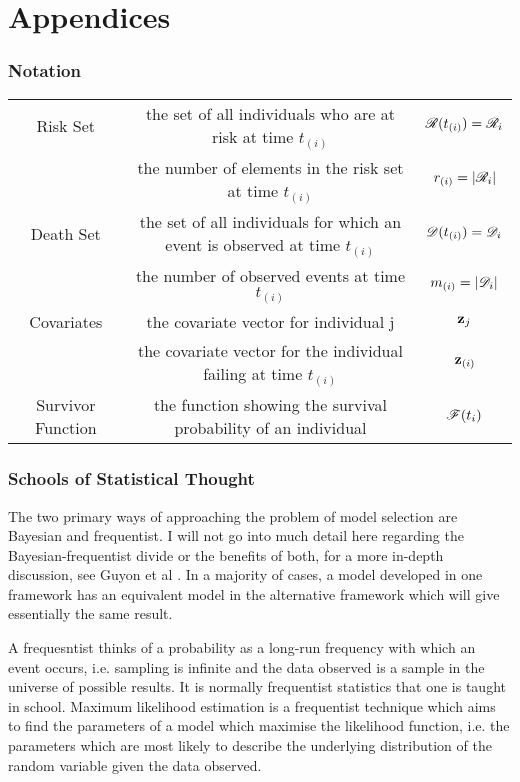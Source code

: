 \part{Appendices}
\begin{appendices}

\section{Notation}

\begin{tabular}{|c|c|c|}
    \hline
    Risk Set & the set of all individuals who are at risk at time $t_{(i)}$ & $\mathscr{R}(t_{(i)})=\mathscr{R}_i$\\
    & the number of elements in the risk set at time $t_{(i)}$ & $r_{(i)}=|\mathscr{R}_i|$ \\
    \hline
    Death Set & the set of all individuals for which an event is observed at time $t_{(i)}$ & $\mathscr{D}(t_{(i)})=\mathscr{D}_i$\\
    & the number of observed events at time $t_{(i)}$ & $m_{(i)}=|\mathscr{D}_i|$\\
    \hline
    Covariates & the covariate vector for individual j & $\textbf{z}_j$\\
    & the covariate vector for the individual failing at time $t_{(i)}$ & $\textbf{z}_{(i)}$\\
    \hline
    Survivor Function & the function showing the survival probability of an individual & $\mathscr{F}(t_i)$\\
\end{tabular}

\section{Schools of Statistical Thought}\label{app:stats-frameworks}

The two primary ways of approaching the problem of model selection are Bayesian and frequentist. I will not go into much detail here regarding the Bayesian-frequentist divide or the benefits of both, for a more in-depth discussion, see Guyon et al . In a majority of cases, a model developed in one framework has an equivalent model in the alternative framework which will give essentially the same result.

A frequesntist thinks of a probability as a long-run frequency with which an event occurs, i.e. sampling is infinite and the data observed is a sample in the universe of possible results. It is normally frequentist statistics that one is taught in school. Maximum likelihood estimation is a frequentist technique which aims to find the parameters of a model which maximise the likelihood function, i.e. the parameters which are most likely to describe the underlying distribution of the random variable given the data observed. 


\end{appendices}
